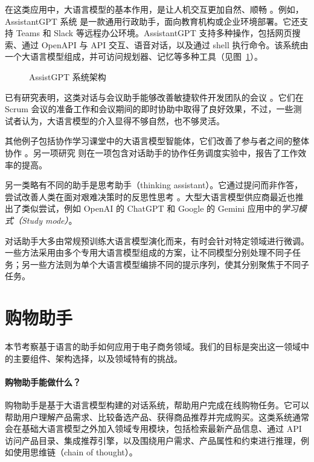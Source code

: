 在这类应用中，大语言模型的基本作用，是让人机交互更加自然、顺畅 \citep{neszlenyi2024assistantgpt,oluwagbade2024conversational}。例如，AssistantGPT 系统 \citep{neszlenyi2024assistantgpt} 是一款通用行政助手，面向教育机构或企业环境部署。它还支持 Teams 和 Slack 等远程办公环境。AssistantGPT 支持多种操作，包括网页搜索、通过 OpenAPI 与 API 交互、语音对话，以及通过 shell 执行命令。该系统由一个大语言模型组成，并可访问规划器、记忆等多种工具（见图~\ref{fig:assist}）。

\begin{figure}
  \begin{center}
    
    \caption{AssistGPT 系统架构 \citep{neszlenyi2024assistantgpt}}\label{fig:assist}
  \end{center}
\end{figure}

已有研究表明，这类对话与会议助手能够改善敏捷软件开发团队的会议 \citep{cabrero2024exploring}。它们在 Scrum 会议的准备工作和会议期间的即时协助中取得了良好效果，不过，一些测试者认为，大语言模型的介入显得不够自然，也不够灵活。

其他例子包括协作学习课堂中的大语言模型智能体，它们改善了参与者之间的整体协作 \citep{wei2024improving}。另一项研究 \citep{bastola2023llm} 则在一项包含对话助手的协作任务调度实验中，报告了工作效率的提高。

另一类略有不同的助手是思考助手（thinking assistant）。它通过提问而非作答，尝试改善人类在面对艰难决策时的反思性思考 \citep{park2023thinking}。大型大语言模型供应商最近也推出了类似尝试，例如 OpenAI 的 ChatGPT 和 Google 的 Gemini 应用中的{\em 学习模式（Study mode）}。

对话助手大多由常规预训练大语言模型演化而来，有时会针对特定领域进行微调。一些方法采用由多个专用大语言模型组成的方案，让不同模型分别处理不同子任务；另一些方法则为单个大语言模型编排不同的提示序列，使其分别聚焦于不同子任务。

\section{购物助手}

本节考察基于语言的助手如何应用于电子商务领域。我们的目标是突出这一领域中的主要组件、架构选择，以及领域特有的挑战。

\paragraph{购物助手能做什么？}
购物助手是基于大语言模型构建的对话系统，帮助用户完成在线购物任务。它可以帮助用户理解产品需求、比较备选产品、获得商品推荐并完成购买。这类系统通常会在基础大语言模型之外加入领域专用模块，包括检索最新产品信息、通过 API 访问产品目录、集成推荐引擎，以及围绕用户需求、产品属性和约束进行推理，例如使用思维链（chain of thought）。

